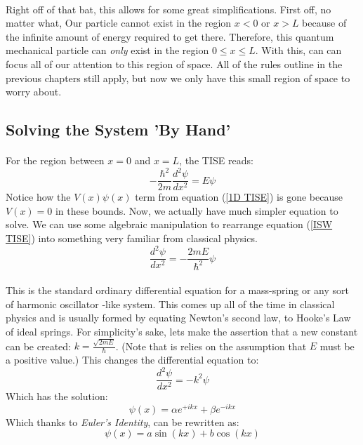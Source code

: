 \documentclass[12pt,letterpaper]{book}
\begin{document}
\paragraph*{}Right off of that bat, this allows for some great simplifications. First off, no matter what, Our particle cannot exist in the region $x < 0$ or $x > L$ because of the infinite amount of energy required to get there. Therefore, this quantum mechanical particle can \textit{only} exist in the region $0 \leq x \leq L$. With this, can can focus all of our attention to this region of space. All of the rules outline in the previous chapters still apply, but now we only have this small region of space to worry about.


\subsection*{Solving the System 'By Hand'}

\paragraph*{}For the region between $x = 0$ and $x = L$, the TISE reads:
\begin{equation}
\label{ISW TISE}
-\frac{\hbar^2}{2m}\frac{d^2 \psi}{dx^2} = E\psi
\end{equation}
Notice how the $V(x)\psi(x)$ term from equation (\ref{1D TISE}) is gone because $V(x) = 0$ in these bounds. Now, we actually have much simpler equation to solve. We can use some algebraic manipulation to rearrange equation (\ref{ISW TISE}) into something very familiar from classical physics.
\begin{equation}
\label{HO ODE}
\frac{d^2 \psi}{dx^2} = -\frac{2mE}{\hbar^2}\psi
\end{equation}
\paragraph{}This is the standard ordinary differential equation for a mass-spring or any sort of harmonic oscillator -like system. This comes up all of the time in classical physics and is usually formed by equating Newton's second law, to Hooke's Law of ideal springs.  For simplicity's sake, lets make the assertion that a new constant can be created: $k = \frac{\sqrt{2mE}}{\hbar}$. (Note that is relies on the assumption that $E$ must be a positive value.) This changes the differential equation to:
\begin{equation}
\frac{d^2 \psi}{dx^2} = -k^2\psi
\end{equation}
Which has the solution:
\begin{equation}
\psi(x) = \alpha e^{+ikx} + \beta e^{-ikx}
\end{equation}
Which thanks to \textit{Euler's Identity}, can be rewritten as:
\begin{equation}
\psi(x) = a \sin(kx) + b \cos(kx)
\end{equation}
\end{document}
